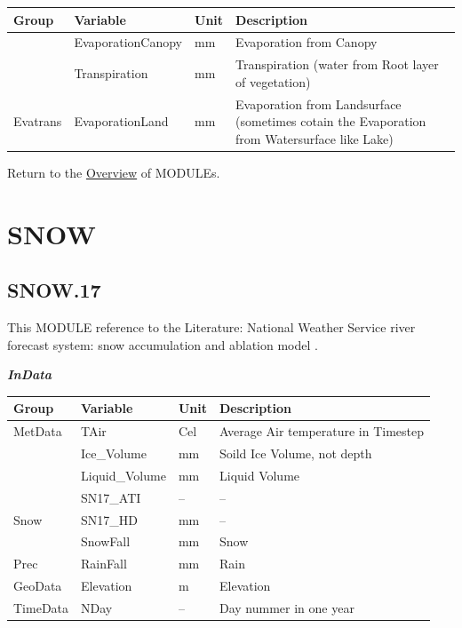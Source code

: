 \documentclass[
]{book}
\begin{document}
\begin{table}[!h]
\centering
\begin{tabular}{l|l|l|l}
\hline
Group & Variable & Unit & Description\\
\hline
 & EvaporationCanopy & mm & Evaporation from Canopy\\
\cline{2-4}
 & Transpiration & mm & Transpiration (water from Root layer of vegetation)\\
\cline{2-4}
\multirow{-3}{*}{\raggedright\arraybackslash Evatrans} & EvaporationLand & mm & Evaporation from Landsurface (sometimes cotain the Evaporation from Watersurface like Lake)\\
\hline
\end{tabular}
\end{table}

Return to the \protect\hyperlink{module}{Overview} of MODULEs.

\hypertarget{SNOW}{%
\section{SNOW}\label{SNOW}}

\hypertarget{SNOW.17}{%
\subsection{SNOW.17}\label{SNOW.17}}

This MODULE reference to the Literature: National Weather Service river forecast system: snow accumulation and ablation model \citep{Anderson.1973}.

\textbf{\emph{InData}}

\begin{table}[!h]
\centering
\begin{tabular}{l|l|l|l}
\hline
Group & Variable & Unit & Description\\
\hline
MetData & TAir & Cel & Average Air temperature in Timestep\\
\cline{1-4}
 & Ice\_Volume & mm & Soild Ice Volume, not depth\\
\cline{2-4}
 & Liquid\_Volume & mm & Liquid Volume\\
\cline{2-4}
 & SN17\_ATI & -- & --\\
\cline{2-4}
\multirow{-4}{*}{\raggedright\arraybackslash Snow} & SN17\_HD & mm & --\\
\cline{1-4}
 & SnowFall & mm & Snow\\
\cline{2-4}
\multirow{-2}{*}{\raggedright\arraybackslash Prec} & RainFall & mm & Rain\\
\cline{1-4}
GeoData & Elevation & m & Elevation\\
\cline{1-4}
TimeData & NDay & -- & Day nummer in one year\\
\hline
\end{tabular}
\end{table}
\end{document}
